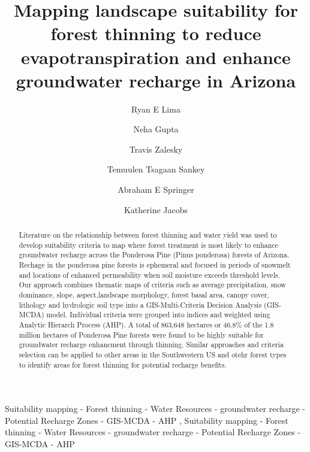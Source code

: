 \documentclass[
  number,
  preprint,
  3p,
  onecolumn]{elsarticle}
\begin{document}
\begin{frontmatter}
\title{Mapping landscape suitability for forest thinning to reduce
evapotranspiration and enhance groundwater recharge in Arizona}
\author[1]{Ryan E Lima%
%
}
\author[2]{Neha Gupta%
%
}

\author[2]{Travis Zalesky%
%
}

\author[1]{Temuulen Tsagaan Sankey%
%
}

\author[1]{Abraham E Springer%
%
}

\author[2]{Katherine Jacobs%
%
}









        
\begin{abstract}
Literature on the relationship between forest thinning and water yield
was used to develop suitability criteria to map where forest treatment
is most likely to enhance groundwater recharge across the Ponderosa Pine
(Pinus ponderosa) forests of Arizona. Rechage in the ponderosa pine
forests is ephemeral and focused in periods of snowmelt and locations of
enhanced permeability when soil moisture exceeds threshold levels. Our
approach combines thematic maps of criteria such as average
precipitation, snow dominance, slope, aspect,landscape morphology,
forest basal area, canopy cover, lithology and hydrologic soil type into
a GIS-Multi-Criteria Decision Analysis (GIS-MCDA) model. Individual
criteria were grouped into indices and weighted using Analytic Hierarch
Process (AHP). A total of 863,648 hectares or 46.8\% of the 1.8 million
hectares of Ponderosa Pine forests were found to be highly suitable for
groundwater recharge enhancment through thinning. Similar approaches and
criteria selection can be applied to other areas in the Southwestern US
and otehr forest types to identify areas for forest thinning for
potential recharge benefits.
\end{abstract}





\begin{keyword}
    Suitability mapping - Forest thinning - Water Resources -
groundwater recharge - Potential Recharge Zones - GIS-MCDA - AHP \sep 
    Suitability mapping - Forest thinning - Water Resources -
groundwater recharge - Potential Recharge Zones - GIS-MCDA - AHP
\end{keyword}
\end{frontmatter}
    
\end{document}
